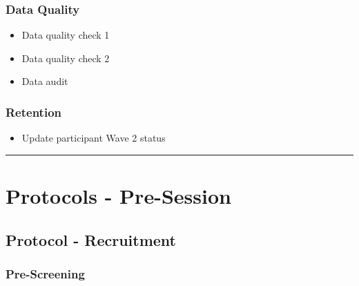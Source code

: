 \documentclass[]{book}
\providecommand{\tightlist}{%
  \setlength{\itemsep}{0pt}\setlength{\parskip}{0pt}}
\begin{document}
\hypertarget{data-quality}{%
\subsubsection{Data Quality}\label{data-quality}}

\begin{itemize}
\tightlist
\item
  Data quality check 1
\item
  Data quality check 2
\item
  Data audit
\end{itemize}

\hypertarget{retention}{%
\subsubsection{Retention}\label{retention}}

\begin{itemize}
\tightlist
\item
  Update participant Wave 2 status
\end{itemize}

\begin{center}\rule{0.5\linewidth}{0.5pt}\end{center}

\hypertarget{protocols---pre-session}{%
\section{Protocols - Pre-Session}\label{protocols---pre-session}}

\hypertarget{protocol---recruitment}{%
\subsection{Protocol - Recruitment}\label{protocol---recruitment}}

\hypertarget{pre-screening}{%
\subsubsection{Pre-Screening}\label{pre-screening}}
\end{document}
